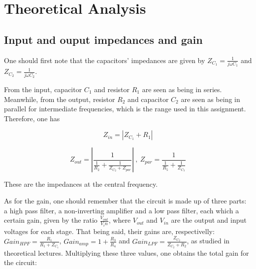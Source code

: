 \section{Theoretical Analysis}
\label{sec:analysis}



\subsection{Input and ouput impedances and gain}

One should first note that the capacitors' impedances are given by $Z_{C_1} = \frac{1}{j \omega C_1}$ and $Z_{C_2} = \frac{1}{j \omega C_2}$.



From the input, capacitor $C_1$ and resistor $R_1$ are seen as being in series. Meanwhile, from the output, resistor $R_2$ and capacitor $C_2$ are seen as being in parallel for intermediate frequencies, which is the range used in this assignment. Therefore, one has

\begin{equation}
Z_{in} = |Z_{C_1} + R_1|
\end{equation}

\begin{equation}
Z_{out} = |\frac{1}{\frac{1}{R_2} + \frac{1}{Z_{C_2} + Z_{par}}}| \ , \ Z_{par} = \frac{1}{\frac{1}{R_5} + \frac{1}{Z_{C_3}}}
\end{equation}

These are the impedances at the central frequency.




As for the gain, one should remember that the circuit is made up of three parts: a high pass filter, a non-inverting amplifier and a low pass filter, each which a certain gain, given by the ratio $\frac{V_{out}}{V_in}$, where $V_{out}$ and $V_{in}$ are the output and input voltages for each stage. That being said, their gains are, respectivelly: $Gain_{HPF} = \frac{R_1}{R_1 + Z_{C_1}}$, $Gain_{amp} = 1+\frac{R_3}{R_4}$ and $Gain_{LPF} = \frac{Z_{C_2}}{Z_{C_2}+R_2}$, as studied in theoretical lectures. Multiplying these three values, one obtains the total gain for the circuit:


